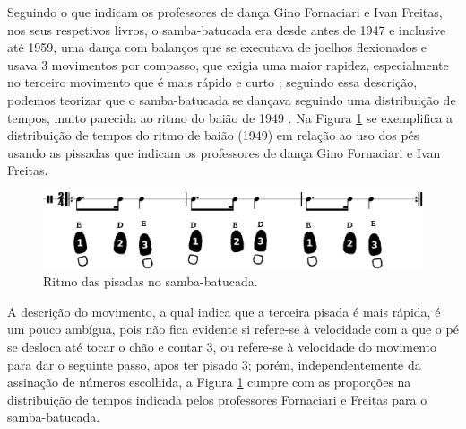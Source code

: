 \begin{itemize}
Seguindo o que indicam  os professores de dança Gino Fornaciari e Ivan Freitas,
nos seus respetivos livros, o samba-batucada era desde antes de 1947 e inclusive até 1959, 
uma dança com balanços que se executava de joelhos flexionados  
e usava 3 movimentos por compasso, que exigia uma maior rapidez, 
especialmente no terceiro movimento que é mais rápido e curto 
\cite[pp. 61]{fornaciari1947aprender} \cite[pp. 58,66]{freitas1959danca};
seguindo essa descrição, 
podemos teorizar que o samba-batucada se dançava seguindo uma distribuição de tempos,
muito parecida ao ritmo do baião de 1949 \cite{CORTES2014}.
Na Figura \ref{time:sambabatucada} se exemplifica a distribuição de tempos do ritmo de baião (1949) em relação ao uso dos pés usando as pissadas que indicam os professores de dança Gino Fornaciari e Ivan Freitas.
\begin{figure}[H]
\centering
\includegraphics[width=\textwidth]{chapters/cap-historia-sambagafieira/sambabatucada.eps}
\caption{Ritmo das pisadas no samba-batucada.}
\label{time:sambabatucada}
\end{figure}



A descrição do movimento, a qual indica que a terceira pisada é mais rápida,
é um pouco ambígua, 
pois não fica evidente si refere-se à velocidade com a que o pé se desloca até tocar o chão e contar 3,
ou refere-se à velocidade do movimento para dar o seguinte passo, apos ter pisado 3;
porém, 
independentemente da assinação de números escolhida, 
a Figura \ref{time:sambabatucada} cumpre com as proporções na distribuição de tempos 
indicada pelos professores Fornaciari e Freitas para o samba-batucada.


\end{itemize}

